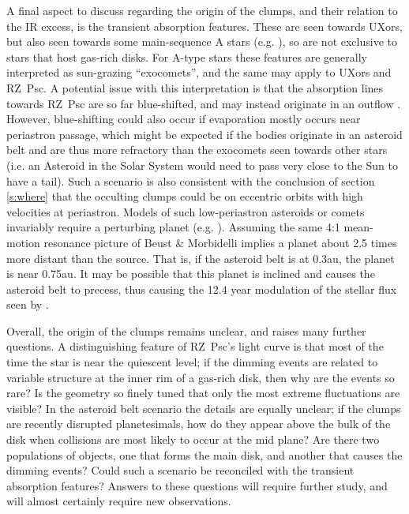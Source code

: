 \documentclass[]{rsos}
\begin{document}
A final aspect to discuss regarding the origin of the clumps, and their relation to the
IR excess, is the transient absorption features. These are seen towards UXors, but also
seen towards some main-sequence A stars
(e.g. \cite{1987A&A...185..267F,2013PASP..125..759W,2014A&A...561L..10K}), so are not
exclusive to stars that host gas-rich disks. For A-type stars these features are
generally interpreted as sun-grazing ``exocomets'', and the same may apply to UXors and
RZ~Psc. A potential issue with this interpretation is that the absorption lines towards
RZ~Psc are so far blue-shifted, and may instead originate in an outflow
\cite{2013Ap.....56..453P}. However, blue-shifting could also occur if evaporation mostly
occurs near periastron passage, which might be expected if the bodies originate in an
asteroid belt and are thus more refractory than the exocomets seen towards other stars
(i.e. an Asteroid in the Solar System would need to pass very close to the Sun to have a
tail). Such a scenario is also consistent with the conclusion of section \ref{s:where}
that the occulting clumps could be on eccentric orbits with high velocities at
periastron. Models of such low-periastron asteroids or comets invariably require a
perturbing planet (e.g. \cite{1990A&A...236..202B,1996Icar..120..358B}). Assuming the
same 4:1 mean-motion resonance picture of Beust \& Morbidelli \cite{1996Icar..120..358B}
implies a planet about 2.5 times more distant than the source. That is, if the asteroid
belt is at 0.3au, the planet is near 0.75au. It may be possible that this planet is
inclined and causes the asteroid belt to precess, thus causing the 12.4 year modulation
of the stellar flux seen by \cite{2013A&A...553L...1D}.

Overall, the origin of the clumps remains unclear, and raises many further questions. A
distinguishing feature of RZ~Psc's light curve is that most of the time the star is near
the quiescent level; if the dimming events are related to variable structure at the inner
rim of a gas-rich disk, then why are the events so rare? Is the geometry so finely tuned
that only the most extreme fluctuations are visible? In the asteroid belt scenario the
details are equally unclear; if the clumps are recently disrupted planetesimals, how do
they appear above the bulk of the disk when collisions are most likely to occur at the
mid plane? Are there two populations of objects, one that forms the main disk, and
another that causes the dimming events? Could such a scenario be reconciled with the
transient absorption features? Answers to these questions will require further study, and
will almost certainly require new observations.
\end{document}
